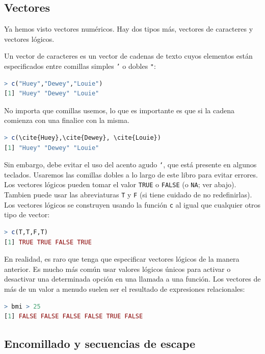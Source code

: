 \documentclass[spanish]{extbook}
\numberwithin{equation}{section}
\numberwithin{figure}{section}
\begin{document}
\subsection{Vectores}

Ya hemos visto vectores numéricos. Hay dos tipos más, vectores de caracteres y
vectores lógicos.

Un vector de caracteres es un vector de cadenas de texto cuyos elementos están
especificados entre comillas simples \texttt{'} o dobles \texttt{"}:

\begin{lstlisting}[language=R]
> c("Huey","Dewey","Louie")
[1] "Huey" "Dewey" "Louie"
\end{lstlisting}

No importa que comillas usemos, lo que es importante es que si la cadena
comienza con una finalice con la misma.

\begin{lstlisting}[language=R]
> c(\cite{Huey},\cite{Dewey}, \cite{Louie})
[1] "Huey" "Dewey" "Louie"
\end{lstlisting}

Sin embargo, debe evitar el uso del acento agudo \texttt{`}, que está presente
en algunos teclados. Usaremos las comillas dobles a lo largo de este libro para
evitar errores. Los vectores lógicos pueden tomar el valor \texttt{TRUE} o
\texttt{FALSE} (o \texttt{NA}; ver abajo). Tambien puede usar las abreviaturas
\texttt{T} y \texttt{F} (si tiene cuidado de no redefinirlas). Los vectores
lógicos se construyen usando la función \texttt{c} al igual que cualquier otros
tipo de vector:
\newpage

\begin{lstlisting}[language=R]
> c(T,T,F,T)
[1] TRUE TRUE FALSE TRUE
\end{lstlisting}

En realidad, es raro que tenga que especificar vectores lógicos de la manera
anterior. Es mucho más común usar valores lógicos únicos para activar o
desactivar una determinada opción en una llamada a una función. Los vectores de
más de un valor a menudo suelen ser el resultado de expresiones relacionales:


\begin{lstlisting}[language=R]
> bmi > 25
[1] FALSE FALSE FALSE FALSE TRUE FALSE
\end{lstlisting}

\subsection{Encomillado y secuencias de escape}
\end{document}
